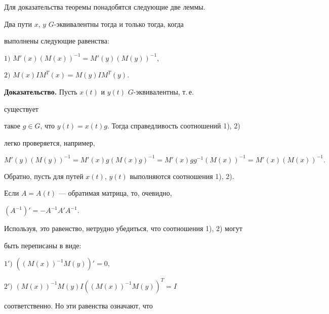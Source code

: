Для доказательства теоремы понадобятся следующие две леммы. 





\begin{lem}


Два пути $x$, $y$\; $G$-эквивалентны тогда и только тогда, когда 


выполнены следующие равенства$:$





$1)$ $M'(x)(M(x))^{-1}=M'(y)(M(y))^{-1}$,





$2)$ $M(x)I M^T(x)=M(y)I M^T(y)$.


\end{lem}





{\bf Доказательство.} Пусть $x(t)$ и $y(t)$\; $G$-эквивалентны, т.\,е. 


существует 


такое $g\in G$, что $y(t)=x(t)g$. Тогда справедливость соотношений 1), 2) 


легко проверяется, например,


$$


M'(y)(M(y))^{-1}=M'(x)g(M(x)g)^{-1}=M'(x)g g^{-1}


(M(x))^{-1}=M'(x)(M(x))^{-1}.


$$





Обратно, пусть для путей $x(t)$, $y(t)$ выполняются соотношения 1), 2). 


Если $A=A(t)$ --- обратимая матрица, то, очевидно, 


$(A^{-1})'=-A^{-1}A'A^{-1}$.


Используя, это равенство, нетрудно убедиться, что соотношения 1), 2) могут 


быть переписаны в виде:





$1')$ $((M(x))^{-1}M(y))'=0$,





$2')$ $(M(x))^{-1}M(y)I((M(x))^{-1}M(y))^T=I$





\noindent{}соответственно. Но эти равенства означают, что 


